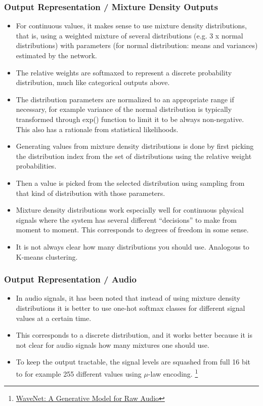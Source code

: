 \documentclass[8pt]{beamer}
\begin{document}
\begin{frame}
\frametitle{Output Representation / Mixture Density Outputs}
 \begin{itemize}
  \item For continuous values, it makes sense to use mixture density distributions, that is, using a weighted mixture of several distributions (e.g. 3 x normal distributions) with
        parameters (for normal distribution: means and variances) estimated by the network.
  \item The relative weights are softmaxed to represent a discrete probability distribution, much like categorical outputs above.
  \item The distribution parameters are normalized to an appropriate range if necessary, for example variance of the normal distribution
        is typically transformed through exp() function to
        limit it to be always non-negative. This also has a rationale from statistical likelihoods.
  \item Generating values from mixture density distributions is done by first picking the distribution index from the set of distributions using the relative weight probabilities.
  \item Then a value is picked from the selected distribution using sampling from that kind of distribution with those parameters.
  \item Mixture density distributions work especially well for continuous physical signals where the system has several different ``decisions''
        to make from moment to moment. This corresponds to degrees of freedom in some sense.
  \item It is not always clear how many distributions you should use. Analogous to K-means clustering.
 \end{itemize}
\end{frame}

\begin{frame}
\frametitle{Output Representation / Audio}
 \begin{itemize}
  \item In audio signals, it has been noted that instead of using mixture density distributions it is better to use one-hot softmax classes for different
        signal values at a certain time.
  \item This corresponds to a discrete distribution, and it works better because it is not clear for audio signals how many mixtures one should use.
  \item To keep the output tractable, the signal levels are squashed from full 16 bit to for example 255 different values using $\mu$-law encoding.
        \footnote{\href{https://deepmind.com/blog/wavenet-generative-model-raw-audio/}
                       {WaveNet: A Generative Model for Raw Audio}}
 \end{itemize}
\end{frame}
\end{document}

